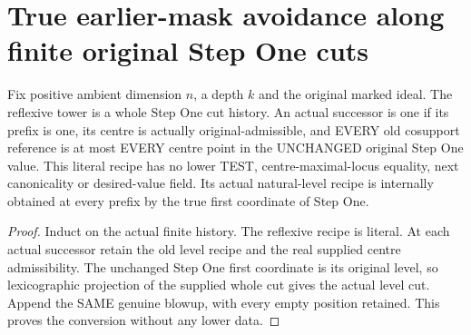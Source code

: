 \section{True earlier-mask avoidance along finite original Step One cuts}

\begin{definition}
\label{hir:original-finite-stepone-cut-history}
\leanok
Fix positive ambient dimension $n$, a depth $k$ and the original marked ideal.
The reflexive tower is a whole Step One cut history. An actual successor
is one if its prefix is one, its centre is actually original-admissible,
and EVERY old cosupport reference is at most EVERY centre point in the
UNCHANGED original Step One value. This literal recipe has no lower TEST,
centre-maximal-locus equality, next canonicality or desired-value field.
Its actual natural-level recipe is internally obtained at every prefix
by the true first coordinate of Step One.
\end{definition}
\begin{proof}
Induct on the actual finite history. The reflexive recipe is literal.
At each actual successor retain the old level recipe and the real supplied
centre admissibility. The unchanged Step One first coordinate is its
original level, so lexicographic projection of the supplied whole cut gives
the actual level cut. Append the SAME genuine blowup, with every empty
position retained. This proves the conversion without any lower data.
\end{proof}

